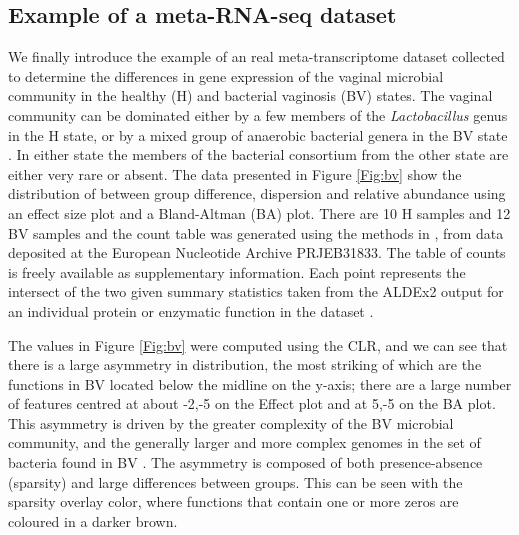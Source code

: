 \documentclass{bmcart}
\begin{document}

\subsection*{Example of a meta-RNA-seq dataset}
 We finally introduce the example of an real meta-transcriptome dataset collected to determine the differences in gene expression of the vaginal microbial community in the healthy (H) and bacterial vaginosis (BV) states. The vaginal community can be dominated either by a few members of the \textit{Lactobacillus} genus in the H state, or by a mixed group of anaerobic bacterial genera in the BV state \cite{Ravel:2010}. In either state the members of the bacterial consortium from the other state are either very rare or absent. The data presented in Figure \ref{Fig:bv} show the distribution of between group difference, dispersion and relative abundance using an effect size plot  and a Bland-Altman (BA) plot. There are 10 H samples and 12 BV samples and the count table was generated using the methods in \cite{Macklaim:2018aa}, from data deposited at the European Nucleotide Archive PRJEB31833. The table of counts is freely available as supplementary information. Each point represents the intersect of the two given summary statistics taken from the ALDEx2 output for an individual protein or enzymatic function in the dataset \cite{macklaim:2013}. 
 
The values in Figure \ref{Fig:bv} were computed using the CLR, and we can see that there is a large asymmetry in distribution, the most striking of which are the functions in BV located below the midline on the y-axis; there are a large number of features centred at about -2,-5 on the Effect plot and at 5,-5 on the BA plot. This asymmetry is driven by the greater complexity of the BV microbial community, and the generally larger and more complex genomes in the set of bacteria found in BV \cite{macklaim:2013}. The asymmetry is composed of both presence-absence (sparsity) and large differences between groups. This can be seen with the sparsity overlay color, where functions that contain one or more zeros are coloured in a darker brown. 
\end{document}
